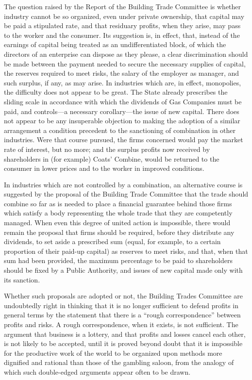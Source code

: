 \documentclass{book}
\begin{document}
The question raised by the Report of the Building Trade Committee is whether industry cannot be so organized, even under private ownership, that capital may be paid a stipulated rate, and that residuary profits, when they arise, may pass to the worker and the consumer. Its suggestion is, in effect, that, instead of the earnings of capital being treated as an undifferentiated block, of which the directors of an enterprise can dispose as they please, a clear discrimination should be made between the payment needed to secure the necessary supplies of capital, the reserves required to meet risks, the salary of the employer as manager, and such surplus, if any, as may arise. In industries which are, in effect, monopolies, the difficulty does not appear to be great. The State already prescribes the sliding scale in accordance with which the dividends of Gas Companies must be paid, and controls—a necessary corollary—the issue of new capital. There does not appear to be any insuperable objection to making the adoption of a similar arrangement a condition precedent to the sanctioning of combination in other industries. Were that course pursued, the firms concerned would pay the market rate of interest, but no more; and the surplus profits now received by shareholders in (for example) Coats’ Combine, would be returned to the consumer in lower prices and to the worker in improved conditions.

In industries which are not controlled by a combination, an alternative course is suggested by the proposal of the Building Trade Committee that the trade should combine so far as is needed to place a financial guarantee behind those firms which satisfy a body representing the whole trade that they are competently managed. When even this degree of united action is impossible, there would remain the proposal that firms should be required, before they distribute any dividends, to set aside a prescribed sum (equal, for example, to a certain proportion of their paid-up capital) as reserves to meet risks, and that, when that sum had been provided, the maximum percentage to be paid to shareholders should be fixed by a Public Authority, and issues of new capital made only with its sanction.

Whether such proposals are adopted or not, the Building Trades Committee are undoubtedly right in thinking that it is no longer sufficient to defend profits in general terms by the statement that there is a “rough correspondence” between profits and risks. A rough correspondence, when it exists, is not sufficient. The argument that business is a lottery, and that profits and losses cancel each other, is not likely to be accepted, until it is proved beyond doubt that it is impossible for the productive work of the world to be organized upon methods more dignified and rational than those of the gambling saloon, from the analogy of which such double-edged arguments appear often to be drawn.
\end{document}
